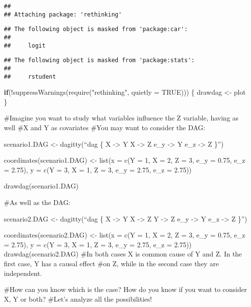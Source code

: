 \documentclass[
]{article}
\newenvironment{Shaded}{\begin{snugshade}}{\end{snugshade}}
\newcommand{\AttributeTok}[1]{\textcolor[rgb]{0.77,0.63,0.00}{#1}}
\newcommand{\ConstantTok}[1]{\textcolor[rgb]{0.00,0.00,0.00}{#1}}
\newcommand{\ControlFlowTok}[1]{\textcolor[rgb]{0.13,0.29,0.53}{\textbf{#1}}}
\newcommand{\FunctionTok}[1]{\textcolor[rgb]{0.00,0.00,0.00}{#1}}
\newcommand{\NormalTok}[1]{#1}
\newcommand{\OtherTok}[1]{\textcolor[rgb]{0.56,0.35,0.01}{#1}}
\newcommand{\SpecialCharTok}[1]{\textcolor[rgb]{0.00,0.00,0.00}{#1}}
\newcommand{\StringTok}[1]{\textcolor[rgb]{0.31,0.60,0.02}{#1}}
\begin{document}
\begin{verbatim}
## 
## Attaching package: 'rethinking'
\end{verbatim}

\begin{verbatim}
## The following object is masked from 'package:car':
## 
##     logit
\end{verbatim}

\begin{verbatim}
## The following object is masked from 'package:stats':
## 
##     rstudent
\end{verbatim}

\begin{Shaded}
\begin{Highlighting}[]
\ControlFlowTok{if}\NormalTok{(}\SpecialCharTok{!}\FunctionTok{suppressWarnings}\NormalTok{(}\FunctionTok{require}\NormalTok{(}\StringTok{"rethinking"}\NormalTok{, }\AttributeTok{quietly =} \ConstantTok{TRUE}\NormalTok{))) \{}
\NormalTok{  drawdag }\OtherTok{\textless{}{-}}\NormalTok{ plot}
\NormalTok{\}}
\end{Highlighting}
\end{Shaded}

\#Imagine you want to study what variables influence the Z variable,
having as well \#X and Y as covariates \#You may want to consider the
DAG:

scenario1.DAG \textless- dagitty(``dag \{ X -\textgreater{} Y X
-\textgreater{} Z e\_y -\textgreater{} Y e\_z -\textgreater{} Z \}'')

coordinates(scenario1.DAG) \textless- list(x = c(Y = 1, X = 2, Z = 3,
e\_y = 0.75, e\_z = 2.75), y = c(Y = 3, X = 1, Z = 3, e\_y = 2.75, e\_z
= 2.75))

drawdag(scenario1.DAG)

\#As well as the DAG:

scenario2.DAG \textless- dagitty(``dag \{ X -\textgreater{} Y X
-\textgreater{} Z Y -\textgreater{} Z e\_y -\textgreater{} Y e\_z
-\textgreater{} Z \}'')

coordinates(scenario2.DAG) \textless- list(x = c(Y = 1, X = 2, Z = 3,
e\_y = 0.75, e\_z = 2.75), y = c(Y = 3, X = 1, Z = 3, e\_y = 2.75, e\_z
= 2.75)) drawdag(scenario2.DAG) \#In both cases X is common cause of Y
and Z. In the first case, Y has a causal effect \#on Z, while in the
second case they are independent.

\#How can you know which is the case? How do you know if you want to
consider X, Y or both? \#Let's analyze all the possibilities!
\end{document}

